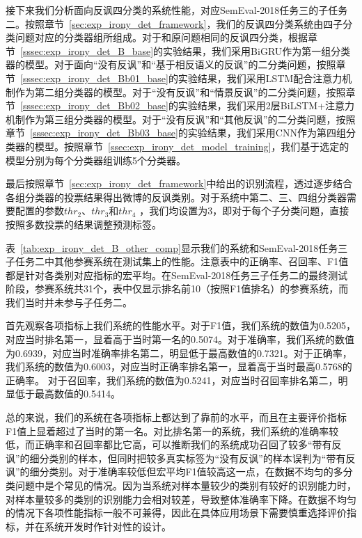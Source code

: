 接下来我们分析面向反讽四分类的系统性能，对应SemEval-2018任务三的子任务二。按照章节~\ref{sec:exp_irony_det_framework}，我们的反讽四分类系统由四子分类问题对应的分类器组所组成。对于和原问题相同的反讽四分类，根据章节~\ref{sssec:exp_irony_det_B_base}的实验结果，我们采用BiGRU作为第一组分类器的模型。对于面向“没有反讽”和“基于相反语义的反讽”的二分类问题，按照章节~\ref{sssec:exp_irony_det_Bb01_base}的实验结果，我们采用LSTM配合注意力机制作为第二组分类器的模型。对于“没有反讽”和“情景反讽”的二分类问题，按照章节~\ref{sssec:exp_irony_det_Bb02_base}的实验结果，我们采用2层BiLSTM+注意力机制作为第三组分类器的模型。对于“没有反讽”和“其他反讽”的二分类问题，按照章节~\ref{sssec:exp_irony_det_Bb03_base}的实验结果，我们采用CNN作为第四组分类器的模型。按照章节~\ref{ssec:exp_irony_det_model_training}，我们基于选定的模型分别为每个分类器组训练5个分类器。

最后按照章节~\ref{sec:exp_irony_det_framework}中给出的识别流程，透过逐步结合各组分类器的投票结果得出微博的反讽类别。对于系统中第二、三、四组分类器需要配置的参数$thr_2$、$thr_3$和$thr_4$ ，我们均设置为3，即对于每个子分类问题，直接按照多数投票的结果调整预测标签。

表~\ref{tab:exp_irony_det_B_other_comp}显示我们的系统和SemEval-2018任务三子任务二中其他参赛系统在测试集上的性能。注意表中的正确率、召回率、F1值都是针对各类别对应指标的宏平均。在SemEval-2018任务三子任务二的最终测试阶段，参赛系统共31个，表中仅显示排名前10（按照F1值排名）的参赛系统，而我们当时并未参与子任务二。
 
首先观察各项指标上我们系统的性能水平。对于F1值，我们系统的数值为0.5205，对应当时排名第一，显着高于当时第一名的0.5074。对于准确率，我们系统的数值为0.6939，对应当时准确率排名第二，明显低于最高数值的0.7321。对于正确率，我们系统的数值为0.6003，对应当时正确率排名第一，显着高于当时最高0.5768的正确率。
对于召回率，我们系统的数值为0.5241，对应当时召回率排名第二，明显低于最高数值的0.5414。

总的来说，我们的系统在各项指标上都达到了靠前的水平，而且在主要评价指标F1值上显着超过了当时的第一名。对比排名第一的系统，我们系统的准确率较低，而正确率和召回率都比它高，可以推断我们的系统成功召回了较多“带有反讽”的细分类别的样本，但同时把较多真实标签为“没有反讽”的样本误判为“带有反讽”的细分类别。对于准确率较低但宏平均F1值较高这一点，在数据不均匀的多分类问题中是个常见的情况。因为当系统对样本量较少的类别有较好的识别能力时，对样本量较多的类别的识别能力会相对较差，导致整体准确率下降。在数据不均匀的情况下各项性能指标一般不可兼得，因此在具体应用场景下需要慎重选择评价指标，并在系统开发时作针对性的设计。

